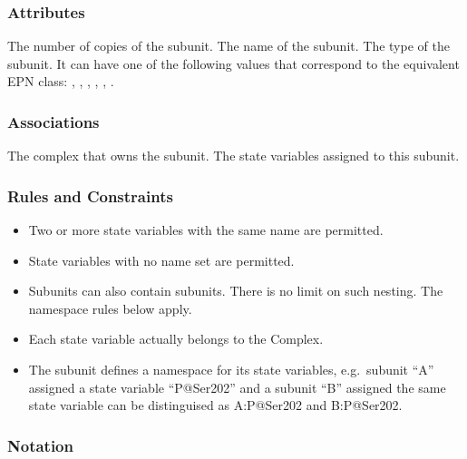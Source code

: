 \subsubsection{Attributes}

\begin{attributes}
   The number of copies of the subunit.
   The name of the subunit.
   The type of the subunit. It can have
  one of the following values that correspond to the equivalent EPN
  class: , ,
  , ,
  , .
\end{attributes}

\subsubsection{Associations}

\begin{attributes}
   The complex that owns the subunit.
   The state variables assigned
  to this subunit.
\end{attributes}

\subsubsection{Rules and Constraints}

\begin{itemize}
\item Two or more state variables with the same name are
  permitted.
\item State variables with no name set are permitted.
\item Subunits can also contain subunits. There is no limit on such nesting. The namespace rules
  below apply.
\item Each state variable actually belongs to the Complex.
\item The subunit defines a namespace for its state variables, e.g.\,
  subunit ``A'' assigned a state variable ``P@Ser202''  and a subunit
  ``B'' assigned the same state variable can be distinguised as
  A:P@Ser202 and B:P@Ser202.
\end{itemize}

\subsubsection{Notation}

